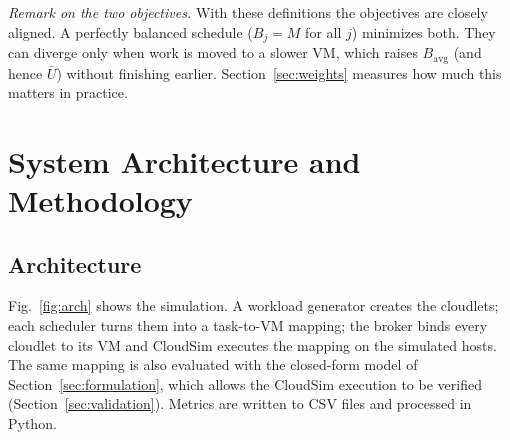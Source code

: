 \documentclass[journal,onecolumn,12pt]{IEEEtran}
\newcommand{\Ubar}{\bar{U}}
\begin{document}
\textit{Remark on the two objectives.} With these definitions the objectives are closely aligned. A perfectly balanced schedule ($B_j=M$ for all $j$) minimizes both. They can diverge only when work is moved to a slower VM, which raises $B_{\mathrm{avg}}$ (and hence $\Ubar$) without finishing earlier. Section~\ref{sec:weights} measures how much this matters in practice.

\section{System Architecture and Methodology}\label{sec:arch}

\subsection{Architecture}
Fig.~\ref{fig:arch} shows the simulation. A workload generator creates the cloudlets; each scheduler turns them into a task-to-VM mapping; the broker binds every cloudlet to its VM and CloudSim executes the mapping on the simulated hosts. The same mapping is also evaluated with the closed-form model of Section~\ref{sec:formulation}, which allows the CloudSim execution to be verified (Section~\ref{sec:validation}). Metrics are written to CSV files and processed in Python.
\end{document}
